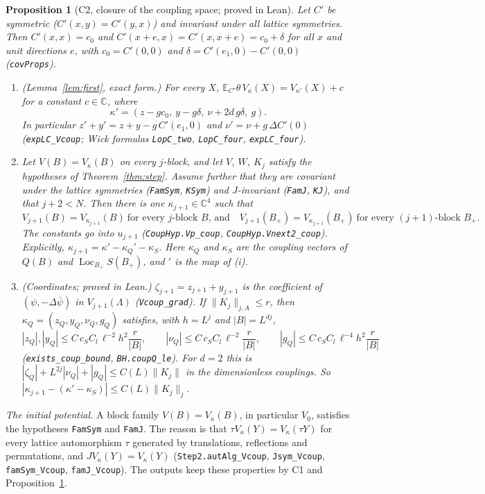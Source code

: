 \documentclass[11pt]{amsart}
\newtheorem{proposition}[theorem]{Proposition}
\theoremstyle{definition}
\theoremstyle{remark}
\numberwithin{equation}{section}
\newcommand{\C}{\mathbb{C}}
\newcommand{\E}{\mathbb{E}}
\newcommand{\Loc}{\operatorname{Loc}}
\begin{document}
\begin{proposition}[C2, closure of the coupling space; proved in Lean]\label{prop:C2}
Let $C'$ be symmetric ($C'(x,y)=C'(y,x)$) and invariant under all lattice symmetries. Then
$C'(x,x)=c_0$ and $C'(x+e,x)=C'(x,x+e)=c_0+\delta$ for all $x$ and unit directions $e$, with
$c_0=C'(0,0)$ and $\delta=C'(e_1,0)-C'(0,0)$ (\texttt{covProps}).
\begin{enumerate}
\item[(i)] (Lemma~\ref{lem:first}, exact form.) For every $X$, $\E_{C'}\theta\,V_\kappa(X)=V_{\kappa'}(X)+c$
  for a constant $c\in\C$, where
  \[
    \kappa'=(z-gc_0,\ y-g\delta,\ \nu+2d\,g\delta,\ g).
  \]
  In particular $z'+y'=z+y-g\,C'(e_1,0)$ and $\nu'=\nu+g\,\Delta C'(0)$
  (\texttt{expLC\_Vcoup}; Wick formulas \texttt{LopC\_two}, \texttt{LopC\_four},
  \texttt{expLC\_four}).
\item[(ii)] Let $V(B)=V_\kappa(B)$ on every $j$-block, and let $V$, $W$, $K_j$ satisfy the
  hypotheses of Theorem~\ref{thm:step}. Assume further that they are covariant under the lattice
  symmetries (\texttt{FamSym}, \texttt{KSym}) and $J$-invariant (\texttt{FamJ}, \texttt{KJ}), and
  that $j+2<N$. Then there is one $\kappa_{j+1}\in\C^4$ such that
  \[
    V_{j+1}(B)=V_{\kappa_{j+1}}(B)\ \text{for every $j$-block $B$, and}\quad
    V_{j+1}(B_+)=V_{\kappa_{j+1}}(B_+)\ \text{for every $(j+1)$-block $B_+$.}
  \]
  The constants go into $u_{j+1}$ (\texttt{CoupHyp.Vp\_coup}, \texttt{CoupHyp.Vnext2\_coup}).
  Explicitly, $\kappa_{j+1}=\kappa'-\kappa_Q'-\kappa_S$. Here $\kappa_Q$ and $\kappa_S$ are the
  coupling vectors of $Q(B)$ and $\Loc_{B_+}S(B_+)$, and $'$ is the map of (i).
\item[(iii)] (Coordinates; proved in Lean.) $\zeta_{j+1}=z_{j+1}+y_{j+1}$ is the coefficient of
  $(\psi,-\Delta\bar\psi)$ in $V_{j+1}(\Lambda)$ (\texttt{Vcoup\_grad}). If $\|K_j\|_{j,A}\le r$,
  then $\kappa_Q=(z_Q,y_Q,\nu_Q,g_Q)$ satisfies, with $h=L^j$ and $|B|=L^{dj}$,
  \[
    |z_Q|,|y_Q|\le C\,c_SC_l\,\ell^{-2}h^2\frac r{|B|},\qquad
    |\nu_Q|\le C\,c_SC_l\,\ell^{-2}\frac r{|B|},\qquad
    |g_Q|\le C\,c_SC_l\,\ell^{-4}h^2\frac r{|B|}
  \]
  (\texttt{exists\_coup\_bound}, \texttt{BH.coupQ\_le}). For $d=2$ this is
  $|\zeta_Q|+L^{2j}|\nu_Q|+|g_Q|\le C(L)\|K_j\|$ in the dimensionless couplings. So
  $|\kappa_{j+1}-(\kappa'-\kappa_S)|\le C(L)\|K_j\|_j$.
\end{enumerate}
\end{proposition}
\noindent\emph{The initial potential.} A block family $V(B)=V_\kappa(B)$, in particular $V_0$,
satisfies the hypotheses \texttt{FamSym} and \texttt{FamJ}. The reason is that
$\tau V_\kappa(Y)=V_\kappa(\tau Y)$ for every lattice automorphism $\tau$ generated by
translations, reflections and permutations, and $JV_\kappa(Y)=V_\kappa(Y)$
(\texttt{Step2.autAlg\_Vcoup}, \texttt{Jsym\_Vcoup}, \texttt{famSym\_Vcoup}, \texttt{famJ\_Vcoup}).
The outputs keep these properties by C1 and Proposition~\ref{prop:C2}.
\end{document}

